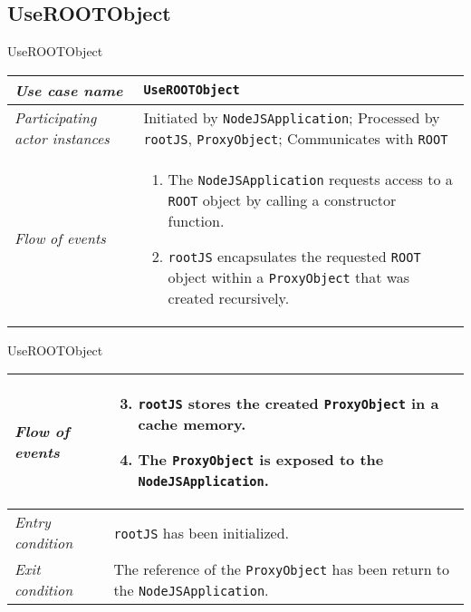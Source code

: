 \subsection{UseROOTObject}
\begin{frame}{UseROOTObject}
        \begin{longtable}{p{3cm} @{\hskip 1cm} p{7cm}}
                \hline

                \textit{Use case name} & \texttt{UseROOTObject}\\
                \hline

                \textit{Participating actor instances} &
                Initiated by \texttt{NodeJSApplication}; Processed by \texttt{rootJS}, \texttt{ProxyObject}; Communicates with \texttt{ROOT}\\
                \hline
                                \pause

                \textit{Flow of events} &
                        \begin{enumerate}
                                \item The \texttt{NodeJSApplication} requests access to a \texttt{ROOT} object by calling a constructor function.
                                \pause
                                \item \texttt{rootJS} encapsulates the requested \texttt{ROOT} object within a \texttt{ProxyObject} that was created recursively.
                        \end{enumerate}
                        \\
        \end{longtable}
\end{frame}
\begin{frame}[t]{UseROOTObject}
        \begin{longtable}{p{3cm} @{\hskip 1cm} p{7cm}}
                \textit{Flow of events} &
                        \begin{enumerate}
                                \setcounter{enumi}{2}
                                \item \texttt{rootJS} stores the created \texttt{ProxyObject} in a cache memory.
                                \pause
                                \item The \texttt{ProxyObject} is exposed to the \texttt{NodeJSApplication}.
                        \end{enumerate}
                        \\
                \hline

                \textit{Entry condition} & \texttt{rootJS} has been initialized.\\
                \hline

                \textit{Exit condition} & The reference of the \texttt{ProxyObject} has been return to the \texttt{NodeJSApplication}.\\
                \hline
        \end{longtable}
\end{frame}

